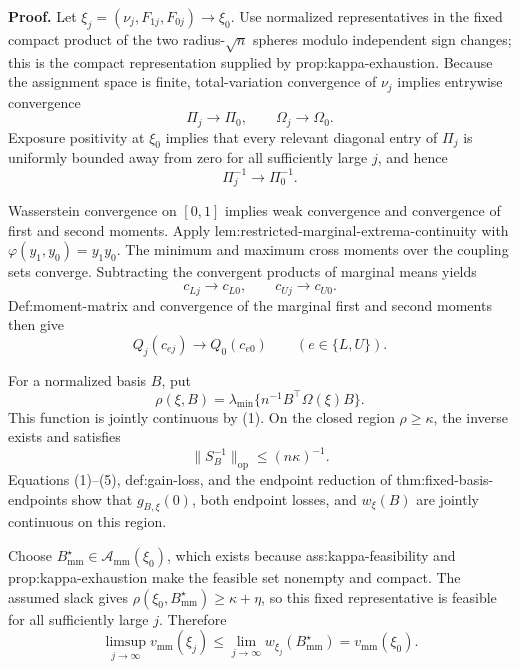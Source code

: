 \textbf{Proof.}
Let \(\xi_j=(\nu_j,F_{1j},F_{0j})\to\xi_0\).  Use normalized representatives in the fixed compact product of the two radius-\(\sqrt n\) spheres modulo independent sign changes; this is the compact representation supplied by prop:kappa-exhaustion.  Because the assignment space is finite, total-variation convergence of \(\nu_j\) implies entrywise convergence
\[
\Pi_j\longrightarrow\Pi_0,
\qquad
\Omega_j\longrightarrow\Omega_0.                                    \tag{1}
\]
Exposure positivity at \(\xi_0\) implies that every relevant diagonal entry of \(\Pi_j\) is uniformly bounded away from zero for all sufficiently large \(j\), and hence
\[
\Pi_j^{-1}\longrightarrow\Pi_0^{-1}.                                \tag{2}
\]

Wasserstein convergence on \([0,1]\) implies weak convergence and convergence of first and second moments.  Apply lem:restricted-marginal-extrema-continuity with \(\varphi(y_1,y_0)=y_1y_0\).  The minimum and maximum cross moments over the coupling sets converge.  Subtracting the convergent products of marginal means yields
\[
c_{Lj}\longrightarrow c_{L0},
\qquad
c_{Uj}\longrightarrow c_{U0}.                                       \tag{3}
\]
Def:moment-matrix and convergence of the marginal first and second moments then give
\[
Q_j(c_{ej})\longrightarrow Q_0(c_{e0})
\qquad(e\in\{L,U\}).                                                \tag{4}
\]

For a normalized basis \(B\), put
\[
\rho(\xi,B)=\lambda_{\min}\{n^{-1}B^{\top}\Omega(\xi)B\}.
\]
This function is jointly continuous by (1).  On the closed region \(\rho\ge\kappa\), the inverse exists and satisfies
\[
\lVert S_B^{-1}\rVert_{\mathrm{op}}\le(n\kappa)^{-1}.               \tag{5}
\]
Equations (1)--(5), def:gain-loss, and the endpoint reduction of thm:fixed-basis-endpoints show that \(g_{B,\xi}(0)\), both endpoint losses, and \(w_\xi(B)\) are jointly continuous on this region.

Choose \(B^\star_{\mathrm{mm}}\in\mathcal A_{\mathrm{mm}}(\xi_0)\), which exists because ass:kappa-feasibility and prop:kappa-exhaustion make the feasible set nonempty and compact.  The assumed slack gives
\(\rho(\xi_0,B^\star_{\mathrm{mm}})\ge\kappa+\eta\), so this fixed representative is feasible for all sufficiently large \(j\).  Therefore
\[
\limsup_{j\to\infty}v_{\mathrm{mm}}(\xi_j)
\le\lim_{j\to\infty}w_{\xi_j}(B^\star_{\mathrm{mm}})
=v_{\mathrm{mm}}(\xi_0).                                           \tag{6}
\]

